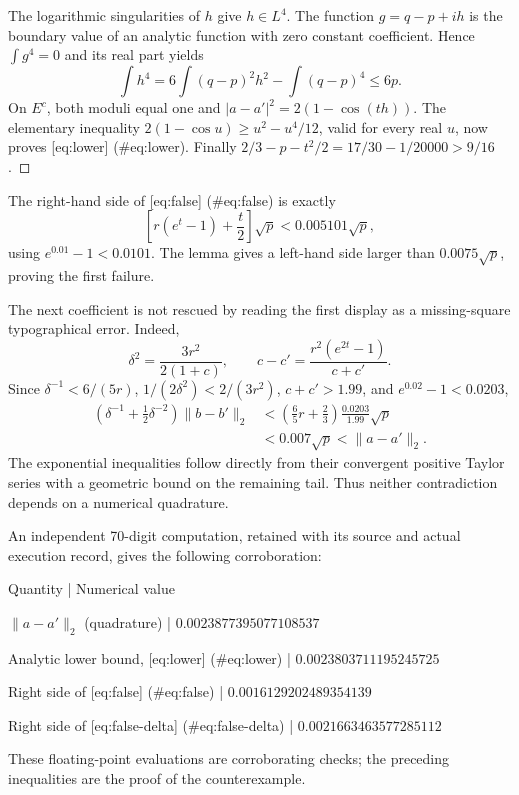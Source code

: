 \documentclass[10pt]{article}
\begin{document}
The logarithmic singularities of \(h\) give \(h\in L^4\). The function \(g=q-p+ih\) is the boundary value of an analytic function with zero constant coefficient. Hence \(\int g^4=0\) and its real part yields \[\int h^4=6\int(q-p)^2h^2-\int(q-p)^4\leq6p.\] On \(E^c\), both moduli equal one and \(|a-a'|^2=2(1-\cos(th))\). The elementary inequality \(2(1-\cos u)\geq u^2-u^4/12\), valid for every real \(u\), now proves [eq:lower] (\#eq:lower). Finally \(2/3-p-t^2/2=17/30-1/20000>9/16\). ◻\par
The right-hand side of [eq:false] (\#eq:false) is exactly \[\left[r(e^t-1)+\frac t2\right]\sqrt p
 <0.005101\sqrt p,\] using \(e^{0.01}-1<0.0101\). The lemma gives a left-hand side larger than \(0.0075\sqrt p\), proving the first failure.\par
The next coefficient is not rescued by reading the first display as a missing-square typographical error. Indeed, \[\delta^2=\frac{3r^2}{2(1+c)},\qquad
 c-c'=\frac{r^2(e^{2t}-1)}{c+c'}.\] Since \(\delta^{-1}<6/(5r)\), \(1/(2\delta^2)<2/(3r^2)\), \(c+c'>1.99\), and \(e^{0.02}-1<0.0203\), \[\begin{aligned}
 (\delta^{-1}+\tfrac12\delta^{-2})\|b-b'\|_2
 &<\left(\frac65r+\frac23\right)
                  \frac{0.0203}{1.99}\sqrt p\\
 &<0.007\sqrt p<\|a-a'\|_2.\end{aligned}\] The exponential inequalities follow directly from their convergent positive Taylor series with a geometric bound on the remaining tail. Thus neither contradiction depends on a numerical quadrature.\par
An independent 70-digit computation, retained with its source and actual execution record, gives the following corroboration:\par
Quantity | Numerical value\par
\(\|a-a'\|_2\) (quadrature) | \(0.0023877395077108537\)\par
Analytic lower bound, [eq:lower] (\#eq:lower) | \(0.0023803711195245725\)\par
Right side of [eq:false] (\#eq:false) | \(0.0016129202489354139\)\par
Right side of [eq:false-delta] (\#eq:false-delta) | \(0.0021663463577285112\)\par
These floating-point evaluations are corroborating checks; the preceding inequalities are the proof of the counterexample.\par
\end{document}
